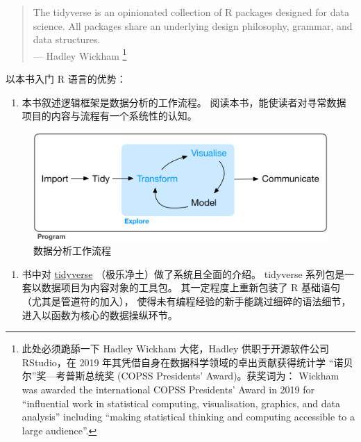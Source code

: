 \documentclass[11pt,hyperref]{ctexart}
\providecommand{\tightlist}{%
  \setlength{\itemsep}{0pt}\setlength{\parskip}{0pt}}
\begin{document}
\begin{quote}
The tidyverse is an opinionated collection of R packages designed for
data science. All packages share an underlying design philosophy,
grammar, and data structures.\\
--- Hadley Wickham \footnote{此处必须跪舔一下 Hadley Wickham
  大佬，Hadley 供职于开源软件公司 RStudio，在 2019
  年其凭借自身在数据科学领域的卓出贡献获得统计学
  ``诺贝尔''奖---考普斯总统奖 (COPSS Presidents' Award)。获奖词为：
  Wickham was awarded the international COPSS Presidents' Award in 2019
  for ``influential work in statistical computing, visualisation,
  graphics, and data analysis'' including ``making statistical thinking
  and computing accessible to a large audience''.}
\end{quote}

以本书入门 R 语言的优势：

\begin{enumerate}
\def\labelenumi{\arabic{enumi}.}
\tightlist
\item
  本书叙述逻辑框架是数据分析的工作流程。
  阅读本书，能使读者对寻常数据项目的内容与流程有一个系统性的认知。
\end{enumerate}

\begin{figure}
\centering
\includegraphics{images/data-science-explore.png}
\caption{数据分析工作流程}
\end{figure}

\begin{enumerate}
\def\labelenumi{\arabic{enumi}.}
\setcounter{enumi}{1}
\tightlist
\item
  书中对 \href{https://www.tidyverse.org/}{tidyverse}
  （极乐净土）做了系统且全面的介绍。 tidyverse
  系列包是一套以数据项目为内容对象的工具包。 其一定程度上重新包装了 R
  基础语句（尤其是管道符的加入），
  使得未有编程经验的新手能跳过细碎的语法细节，进入以函数为核心的数据操纵环节。
\end{enumerate}
\end{document}
